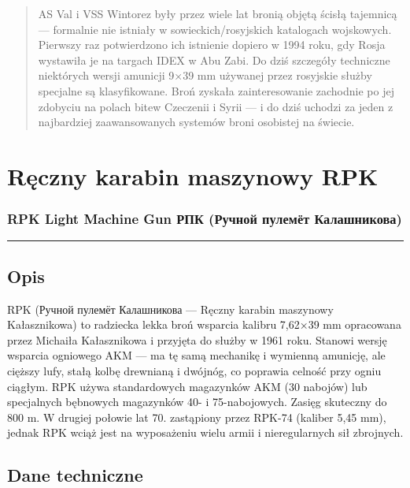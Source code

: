 \documentclass[12pt,openany,oneside]{book}
\begin{document}
\begin{quote}
AS Val i VSS Wintorez były przez wiele lat bronią objętą ścisłą
tajemnicą --- formalnie nie istniały w sowieckich/rosyjskich katalogach
wojskowych. Pierwszy raz potwierdzono ich istnienie dopiero w 1994 roku,
gdy Rosja wystawiła je na targach IDEX w Abu Zabi. Do dziś szczegóły
techniczne niektórych wersji amunicji 9×39 mm używanej przez rosyjskie
służby specjalne są klasyfikowane. Broń zyskała zainteresowanie
zachodnie po jej zdobyciu na polach bitew Czeczenii i Syrii --- i do
dziś uchodzi za jeden z najbardziej zaawansowanych systemów broni
osobistej na świecie.
\end{quote}

\chapter{Ręczny karabin maszynowy
RPK}\label{rux119czny-karabin-maszynowy-rpk}

\subsection{RPK Light Machine Gun \textbar{} РПК (Ручной пулемёт
Калашникова)}\label{rpk-light-machine-gun-ux440ux43fux43a-ux440ux443ux447ux43dux43eux439-ux43fux443ux43bux435ux43cux451ux442-ux43aux430ux43bux430ux448ux43dux438ux43aux43eux432ux430}

\begin{center}\rule{0.5\linewidth}{0.5pt}\end{center}

\section{Opis}\label{opis-54}

RPK (Ручной пулемёт Калашникова --- Ręczny karabin maszynowy
Kałasznikowa) to radziecka lekka broń wsparcia kalibru 7,62×39 mm
opracowana przez Michaiła Kałasznikowa i przyjęta do służby w 1961 roku.
Stanowi wersję wsparcia ogniowego AKM --- ma tę samą mechanikę i
wymienną amunicję, ale cięższy lufy, stałą kolbę drewnianą i dwójnóg, co
poprawia celność przy ogniu ciągłym. RPK używa standardowych magazynków
AKM (30 nabojów) lub specjalnych bębnowych magazynków 40- i
75-nabojowych. Zasięg skuteczny do 800 m. W drugiej połowie lat 70.
zastąpiony przez RPK-74 (kaliber 5,45 mm), jednak RPK wciąż jest na
wyposażeniu wielu armii i nieregularnych sił zbrojnych.

\section{Dane techniczne}\label{dane-techniczne-54}
\end{document}
